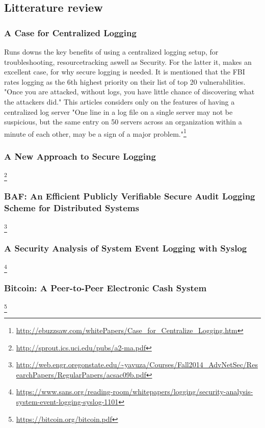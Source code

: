 \subsection{Litterature review}

\subsubsection{A Case for Centralized Logging }

Runs downs the key benefits of using a centralized logging setup, for troubleshooting, resourcetracking aswell as Security. 
For the latter it, makes an excellent case, for why secure logging is needed. It is mentioned that the FBI rates logging as the 6th highest priority on their list of top 20 vulnerabilities. "Once you are attacked, without logs, you have little chance of discovering what the attackers did."
This articles considers only on the features of having a centralized log server "One line in a log file on a single server may not be suspicious, but the same entry on 50 servers across an organization within a minute of each other, may be a sign of a major problem."\footnote{\url{http://ebuzzsaw.com/whitePapers/Case_for_Centralize_Logging.htm}}

\subsubsection{A New Approach to Secure Logging}
\footnote{\url{http://sprout.ics.uci.edu/pubs/a2-ma.pdf}}

\subsubsection{BAF: An Efficient Publicly Verifiable Secure Audit Logging Scheme for Distributed Systems}
\footnote{\raggedright \url{http://web.engr.oregonstate.edu/~yavuza/Courses/Fall2014_AdvNetSec/ResearchPapers/RegularPapers/acsac09b.pdf}}

\subsubsection{A Security Analysis of System Event Logging with Syslog}
\footnote{\raggedright \url{https://www.sans.org/reading-room/whitepapers/logging/security-analysis-system-event-logging-syslog-1101}}

\subsubsection{Bitcoin: A Peer-to-Peer Electronic Cash System}
\footnote{\url{https://bitcoin.org/bitcoin.pdf}}
\newpage

